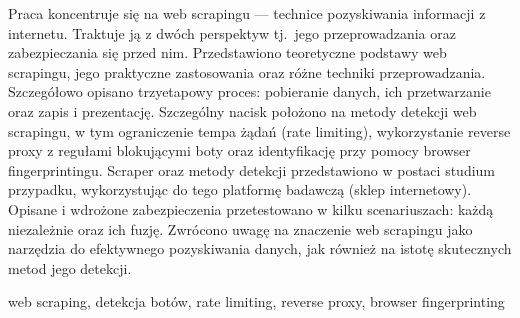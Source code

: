\streszczenie
Praca koncentruje się na web scrapingu --- technice pozyskiwania informacji z internetu.
Traktuje ją z dwóch perspektyw tj.~jego przeprowadzania oraz zabezpieczania się przed nim.
Przedstawiono teoretyczne podstawy web scrapingu, jego praktyczne zastosowania oraz różne techniki przeprowadzania.
Szczegółowo opisano trzyetapowy proces: pobieranie danych, ich przetwarzanie oraz zapis i prezentację.
Szczególny nacisk położono na metody detekcji web scrapingu, w tym ograniczenie tempa żądań (rate limiting),
wykorzystanie reverse proxy z regułami blokującymi boty oraz identyfikację przy pomocy browser fingerprintingu.
Scraper oraz metody detekcji przedstawiono w postaci studium przypadku, wykorzystując do tego platformę badawczą (sklep internetowy).
Opisane i wdrożone zabezpieczenia przetestowano w kilku scenariuszach: każdą niezależnie oraz ich fuzję.
Zwrócono uwagę na znaczenie web scrapingu jako narzędzia do efektywnego pozyskiwania danych, jak również na istotę skutecznych metod jego detekcji.

\slowakluczowe web scraping, detekcja botów, rate limiting, reverse proxy, browser fingerprinting